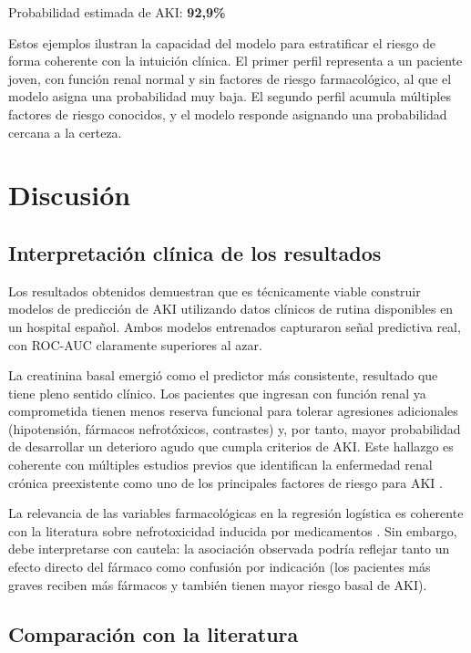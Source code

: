 \documentclass[12pt, a4paper, oneside]{report}
\begin{document}
Probabilidad estimada de AKI: \textbf{92,9\%}

Estos ejemplos ilustran la capacidad del modelo para estratificar el riesgo de forma coherente con la intuición clínica. El primer perfil representa a un paciente joven, con función renal normal y sin factores de riesgo farmacológico, al que el modelo asigna una probabilidad muy baja. El segundo perfil acumula múltiples factores de riesgo conocidos, y el modelo responde asignando una probabilidad cercana a la certeza.

\section{Discusión}

\subsection{Interpretación clínica de los resultados}

Los resultados obtenidos demuestran que es técnicamente viable construir modelos de predicción de AKI utilizando datos clínicos de rutina disponibles en un hospital español. Ambos modelos entrenados capturaron señal predictiva real, con ROC-AUC claramente superiores al azar.

La creatinina basal emergió como el predictor más consistente, resultado que tiene pleno sentido clínico. Los pacientes que ingresan con función renal ya comprometida tienen menos reserva funcional para tolerar agresiones adicionales (hipotensión, fármacos nefrotóxicos, contrastes) y, por tanto, mayor probabilidad de desarrollar un deterioro agudo que cumpla criterios de AKI. Este hallazgo es coherente con múltiples estudios previos que identifican la enfermedad renal crónica preexistente como uno de los principales factores de riesgo para AKI \cite{chawla2014nejm, kellum2021acute}.

La relevancia de las variables farmacológicas en la regresión logística es coherente con la literatura sobre nefrotoxicidad inducida por medicamentos \cite{perazella2019, perazella2022}. Sin embargo, debe interpretarse con cautela: la asociación observada podría reflejar tanto un efecto directo del fármaco como confusión por indicación (los pacientes más graves reciben más fármacos y también tienen mayor riesgo basal de AKI).

\subsection{Comparación con la literatura}
\end{document}
